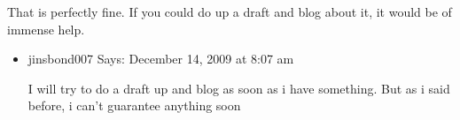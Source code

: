 \begin{english}
\begin{itemize}
\begin{itemize}
    That is perfectly fine. If you could do up a draft and blog about it, it would be of immense help.
	\begin{itemize}
        \item jinsbond007 Says:
        December 14, 2009 at 8:07 am

        I will try to do a draft up and blog as soon as i have something. But as i said before, i can’t guarantee anything soon
	\end{itemize}
    \end{itemize}
\end{itemize}
\end{english}
